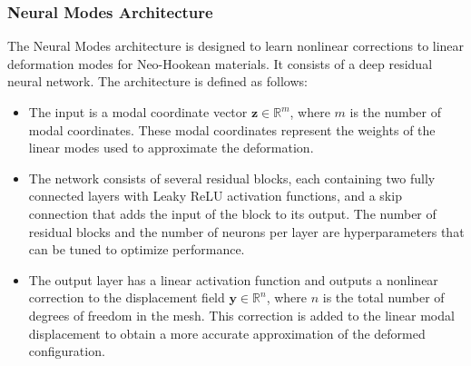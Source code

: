 \subsubsection{Neural Modes Architecture}
The Neural Modes architecture is designed to learn nonlinear corrections to linear deformation modes for Neo-Hookean materials. It consists of a deep residual neural network. The architecture is defined as follows:

\begin{itemize}
    \item The input is a modal coordinate vector \( \bm{z} \in \mathbb{R}^m \), where $m$ is the number of modal coordinates. These modal coordinates represent the weights of the linear modes used to approximate the deformation.
    \item The network consists of several residual blocks, each containing two fully connected layers with Leaky ReLU activation functions, and a skip connection that adds the input of the block to its output. The number of residual blocks and the number of neurons per layer are hyperparameters that can be tuned to optimize performance.
    \item The output layer has a linear activation function and outputs a nonlinear correction to the displacement field \( \bm{y} \in \mathbb{R}^n \), where $n$ is the total number of degrees of freedom in the mesh. This correction is added to the linear modal displacement to obtain a more accurate approximation of the deformed configuration.
\end{itemize}

